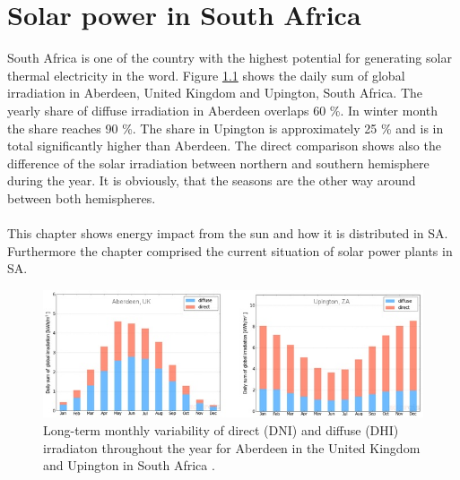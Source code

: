 \documentclass[Master,MEE,english]{twbook}%
\begin{document}
\chapter{Solar power in South Africa}\label{Solar power in South Africa}
South Africa is one of the country with the highest potential for generating solar thermal electricity in the word. Figure \ref{DHI-DIF} shows  the daily sum of global irradiation in Aberdeen, United Kingdom and Upington, South Africa. The yearly share of diffuse irradiation in Aberdeen overlaps 60 \%. In winter month the share reaches 90 \%. The share in Upington is approximately 25 \% and is in total significantly higher than Aberdeen. The direct comparison shows also the difference of the solar irradiation between northern and southern hemisphere during the year. It is obviously, that the seasons are the other way around between both hemispheres.\\
\\
This chapter shows energy impact from the sun and how it is distributed in SA. Furthermore the chapter comprised the current situation of solar power plants in SA.
\begin{figure}[h!] %
\centering
\includegraphics[width=1\linewidth]{FIG/DHI-DIF}
\caption[Long-term monthly variability of direct (DNI) and diffuse (DHI) irradiaton throughout the year for Aberdeen in the United Kingdom and Upington in South Africa.]{Long-term monthly variability of direct (DNI) and diffuse (DHI) irradiaton throughout the year for Aberdeen in the United Kingdom and Upington in South Africa \cite{SolarGIS2015}.}\label{DHI-DIF}
\end{figure} 
\end{document}
